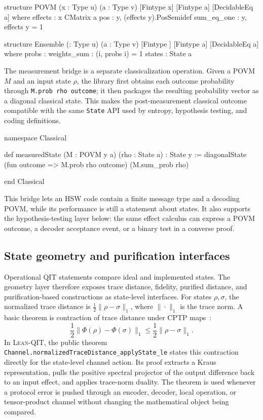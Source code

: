\documentclass[10pt,a4paper]{article}
\DeclareRobustCommand{\LeanQIT}{\textnormal{\textsc{Lean-QIT}}}
\begin{document}
\begin{qitleancode}[title={Classical and measurement objects}]
structure POVM (x : Type u) (a : Type v) [Fintype x] [Fintype a] [DecidableEq a] where
  effects : x \to CMatrix a
  pos : \forall y, (effects y).PosSemidef
  sum_eq_one : \sum y, effects y = 1

structure Ensemble (\iota : Type u) (a : Type v)
    [Fintype \iota] [Fintype a] [DecidableEq a] where
  probs : \iota \to \Rnonneg
  weights_sum : (\sum i, probs i) = 1
  states : \iota \to State a
\end{qitleancode}
	
The measurement bridge is a separate classicalization operation.  Given a POVM $M$ and an input state $\rho$, the library first obtains each outcome probability through \texttt{M.prob rho outcome}; it then packages the resulting probability vector as a diagonal classical state.  This makes the post-measurement classical outcome compatible with the same \texttt{State} API used by entropy, hypothesis testing, and coding definitions.
	
\begin{qitleancode}[title={Measurement-to-classical bridge}]
namespace Classical

def measuredState (M : POVM y a) (rho : State a) : State y :=
  diagonalState (fun outcome => M.prob rho outcome) (M.sum_prob rho)

end Classical
\end{qitleancode}
	
	This bridge lets an HSW code contain a finite message type and a
	decoding POVM, while its performance is still a statement about states.  It
	also supports the hypothesis-testing layer below: the same effect calculus can
	express a POVM outcome, a decoder acceptance event, or a binary test in a
	converse proof.
	
	\subsection{State geometry and purification interfaces}
	\label{subsec:state-geometry}
	
	Operational QIT statements compare ideal and implemented states.  The
	geometry layer therefore exposes trace distance, fidelity, purified distance,
	and purification-based constructions as state-level interfaces.  For states
	$\rho,\sigma$, the normalized trace distance is
	$\frac12\|\rho-\sigma\|_1$, where $\|\cdot\|_1$ is the trace norm.  A
	basic theorem is contraction of trace distance under CPTP maps~\cite{Wilde2017}:
	\begin{equation}
		\frac12\|\Phi(\rho)-\Phi(\sigma)\|_1
		\le
		\frac12\|\rho-\sigma\|_1 .
	\end{equation}
	In \LeanQIT{}, the public theorem
	\texttt{Channel.normalizedTraceDistance\_applyState\_le} states this
	contraction directly for the state-level channel action.  Its proof extracts a
	Kraus representation, pulls the positive spectral projector of the output
	difference back to an input effect, and applies trace-norm duality.  The theorem
	is used whenever a protocol error is pushed through an encoder, decoder, local
	operation, or tensor-product channel without changing the mathematical object
	being compared.
	
\end{document}
